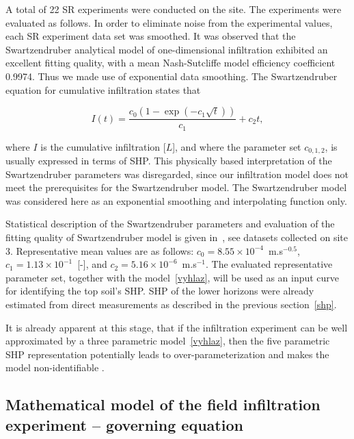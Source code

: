 \documentclass[review]{elsarticle}
\newenvironment{lineq}
    {\begin{linenomath*}
    \begin{equation}
    }
    { 
    \end{equation} 
    \end{linenomath*}
    }
\begin{document}
A total of 22 SR experiments were conducted on the site. The experiments were evaluated as follows. In order to eliminate noise from the experimental values, each SR experiment data set was smoothed. It was observed that the Swartzendruber analytical model \citep{Swartzendruber}
of one-dimensional infiltration exhibited an excellent fitting quality, with a mean  Nash-Sutcliffe model efficiency coefficient  0.9974. Thus we made use of exponential data smoothing. The Swartzendruber equation for cumulative infiltration states that
\begin{lineq}
I(t)=\frac{c_0\left(1-\exp\left(-c_1\sqrt{t}\right)\right)}{c_1}+c_2t,
\label{vyhlaz}
\end{lineq}
where $I$ is the cumulative infiltration [$L$], and where the parameter set $c_{0,1,2}$, is usually expressed in terms of SHP. This physically based interpretation of the Swartzendruber parameters was disregarded, since our infiltration model does not meet the prerequisites for the Swartzendruber model. The Swartzendruber model was considered here as an exponential smoothing and interpolating function only.



 
Statistical description of the Swartzendruber parameters and evaluation of the fitting quality of Swartzendruber model is given in~\citep{jacka-site}, see datasets collected on site 3. Representative mean values are as follows: $c_0 = 8.55\times 10^{-4}$~m.s$^{-0.5}$, $c_1 = 1.13 \times 10^{-1}$~[-], and $c_2 = 5.16\times 10^{-6}$~m.s$^{-1}$. The evaluated representative  parameter set, together with the model~\eqref{vyhlaz}, will be used as an input curve for identifying the top soil's SHP. SHP of the lower horizons were already estimated from direct measurements as described in the previous section~\ref{shp}.

It is already apparent at this stage, that if the infiltration experiment can be well approximated by a three parametric model~\eqref{vyhlaz}, then the five parametric SHP representation potentially leads to over-parameterization and makes the model non-identifiable \citep{bellman1970}.  








\subsection{Mathematical model of the field infiltration experiment -- governing equation}%
\label{goveq}
\end{document}
